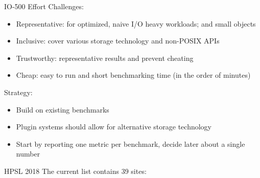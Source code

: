 \documentclass[portrait,a0paper,fontscale=0.4]{baposter}
\begin{document}
\begin{poster}
\begin{posterbox}[name=HHCC,column=1,span=2, below=schedule, above=bottom]{IO-500 Effort}
Challenges:
\vspace*{-1em}
\begin{itemize}
\item Representative: for optimized, naive I/O heavy workloads; and small objects
\item Inclusive: cover various storage technology and non-POSIX APIs
\item Trustworthy: representative results and prevent cheating
\item Cheap: easy to run and short benchmarking time (in the order of minutes)
\end{itemize}


Strategy:
\vspace*{-1em}
\begin{itemize}
\item Build on existing benchmarks
\item Plugin systems should allow for alternative storage technology
\item Start by reporting one metric per benchmark, decide later about a single number
\end{itemize}


\end{posterbox}






\begin{posterbox}[name=engineering,column=3]{HPSL 2018}
The current list contains 39 sites:


\end{posterbox}
\end{poster}
\end{document}

